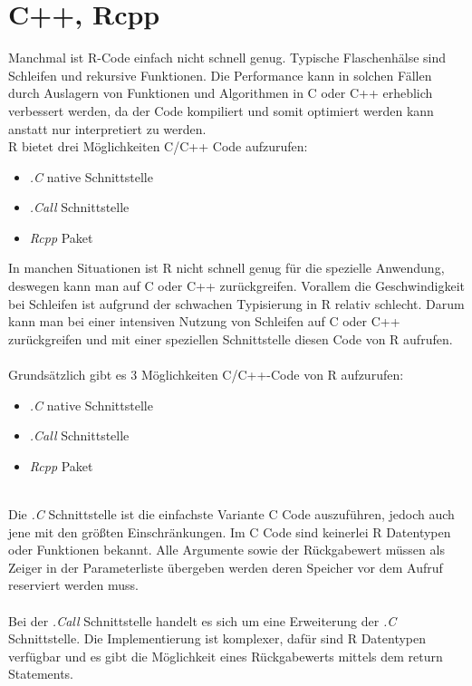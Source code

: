 \section{C++, Rcpp}
\label{kapitel:rcpp}
Manchmal ist R-Code einfach nicht schnell genug. Typische Flaschenhälse sind Schleifen und rekursive Funktionen. Die Performance kann in solchen Fällen durch Auslagern von Funktionen und Algorithmen in C oder C++ erheblich verbessert werden, da der Code kompiliert und somit optimiert werden kann anstatt nur interpretiert zu werden.\\
R bietet drei Möglichkeiten C/C++ Code aufzurufen:
\begin{itemize}
	\item \emph{.C} native Schnittstelle
	\item \emph{.Call} Schnittstelle
	\item \emph{Rcpp} Paket
\end{itemize}
In manchen Situationen ist R nicht schnell genug für die spezielle Anwendung, deswegen kann man auf C oder C++ zurückgreifen. Vorallem die Geschwindigkeit bei Schleifen ist aufgrund der schwachen Typisierung in R relativ schlecht. Darum kann man bei einer intensiven Nutzung von Schleifen auf C oder C++ zurückgreifen und mit einer speziellen Schnittstelle diesen Code von R aufrufen.
\\
\\
Grundsätzlich gibt es 3 Möglichkeiten C/C++-Code von R aufzurufen:
\begin{itemize}
	\item \emph{.C} native Schnittstelle
	\item \emph{.Call} Schnittstelle
	\item \emph{Rcpp} Paket
\end{itemize}
\\
Die \emph{.C} Schnittstelle ist die einfachste Variante C Code auszuführen, jedoch auch jene mit den größten Einschränkungen. Im C Code sind keinerlei R Datentypen oder Funktionen bekannt. Alle Argumente sowie der Rückgabewert müssen als Zeiger in der Parameterliste übergeben werden deren Speicher vor dem Aufruf reserviert werden muss.
\\
\\
Bei der \emph{.Call} Schnittstelle handelt es sich um eine Erweiterung der \emph{.C} Schnittstelle. Die Implementierung ist komplexer, dafür sind R Datentypen verfügbar und es gibt die Möglichkeit eines Rückgabewerts mittels dem return Statements. \cite{wickham2015r}
\\
